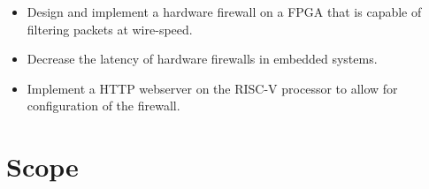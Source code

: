 \begin{itemize}
    \item Design and implement a hardware firewall on a FPGA that is capable of filtering packets at wire-speed.
    \item Decrease the latency of hardware firewalls in embedded systems. 
    \item Implement a HTTP webserver on the RISC-V processor to allow for configuration of the firewall.
    
\end{itemize}


\section{Scope}

